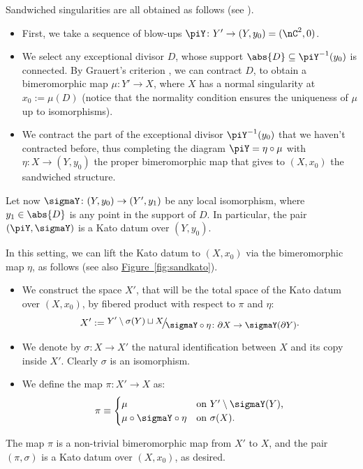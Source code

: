 \documentclass[11 pt, twoside, a4paper]{amsart}
\def\nfrac#1#2{%
    \raise.5ex\hbox{\small{$#1$}}%
    \kern-.18em\big/\kern-.2em%
    \lower.5ex\hbox{\small{$#2$}}}
\newcommand{\Kpi}{{\pi}} %
\newcommand{\Ksigma}{{\sigma}} %
\theoremstyle{definition}
\theoremstyle{definition}
\newcommand{\reffig}[1]{\hyperref[fig:#1]{Figure~\ref*{fig:#1}}}
\begin{document}
Sandwiched singularities are all obtained as follows (see \cite[Section II.1]{spivakovsky:sandwichedsing}).
\begin{itemize}
\item First, we take a sequence of blow-ups $\piY \colon Y' \to (Y,y_0)= (\nC^2,0)$.
\item We select any exceptional divisor $D$, whose support $\abs{D} \subseteq \piY^{-1}(y_0)$ is connected.
By Grauert's criterion \cite{grauert:ubermodifikationen}, we can contract $D$, to obtain a bimeromorphic map $\mu \colon Y' \to X$, where $X$ has a normal singularity at $x_0:=\mu(D)$ (notice that the normality condition ensures the uniqueness of $\mu$ up to isomorphisms).
\item We contract the part of the exceptional divisor $\piY^{-1}(y_0)$ that we haven't contracted before, thus completing the diagram $\piY= \eta \circ \mu$ with $\eta\colon X \to (Y,y_0)$ the proper bimeromorphic map that gives to $(X,x_0)$ the sandwiched structure.
\end{itemize}

Let now $\sigmaY \colon (Y,y_0) \to (Y',y_1)$ be any local isomorphism, where $y_1 \in \abs{D}$ is any point in the support of $D$.
In particular, the pair $(\piY,\sigmaY)$ is a Kato datum over $(Y,y_0)$.

In this setting, we can lift the Kato datum to $(X,x_0)$ via the bimeromorphic map $\eta$, as follows (see also \reffig{sandkato}).

\begin{itemize}
\item We construct the space $X'$, that will be the total space of the Kato datum over $(X,x_0)$, by fibered product with respect to $\pi$ and $\eta$:
$$
X':= \nfrac{Y' \setminus \sigma(Y) \sqcup X}{\sigmaY \circ \eta \colon \partial X \to \sigmaY(\partial Y)}\text{.}
$$
\item We denote by $\Ksigma \colon X \to X'$ the natural identification between $X$ and its copy inside $X'$. Clearly $\Ksigma$ is an isomorphism.
\item We define the map $\Kpi \colon X' \to X$ as:
$$
\Kpi \equiv
\begin{cases}
\mu &\text{on } Y' \setminus \sigmaY(Y)\text{,}\\
\mu \circ \sigmaY \circ \eta &\text{on } \Ksigma(X)\text{.}
\end{cases}
$$
\end{itemize}
The map $\Kpi$ is a non-trivial bimeromorphic map from $X'$ to $X$, and the pair $(\Kpi,\Ksigma)$ is a Kato datum over $(X,x_0)$, as desired.
\end{document}
